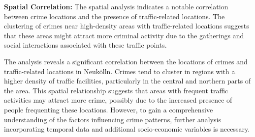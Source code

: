 \textbf{Spatial Correlation:} The spatial analysis indicates a notable correlation between crime locations and the presence of traffic-related locations. The clustering of crimes near high-density areas with traffic-related locations suggests that these areas might attract more criminal activity due to the gatherings and social interactions associated with these traffic points. 

The analysis reveals a significant correlation between the locations of crimes and traffic-related locations in Neukölln. Crimes tend to cluster in regions with a higher density of traffic facilities, particularly in the central and northern parts of the area. This spatial relationship suggests that areas with frequent traffic activities may attract more crime, possibly due to the increased presence of people frequenting these locations. However, to gain a comprehensive understanding of the factors influencing crime patterns, further analysis incorporating temporal data and additional socio-economic variables is necessary. 
%
%
%  
%
%
%
%
